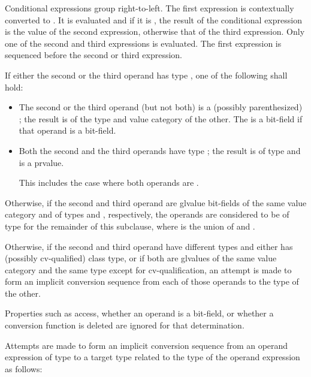 \pnum
Conditional expressions group right-to-left. The first expression is
contextually converted to .
It is
evaluated and if it is , the result of the conditional
expression is the value of the second expression, otherwise that of the
third expression. Only one of the second and third expressions is
evaluated.
The first expression is sequenced before
the second or third expression.

\pnum
If either the second or the third operand has type ,
one of the following shall hold:
\begin{itemize}
\item
{}%
The second or the third operand (but not both) is a (possibly
parenthesized) ; the result
is of the type and value category of the other.
The 
is a bit-field if that operand is a bit-field.

\item Both the second and the third operands have type ; the
result is of type  and is a prvalue.
\begin{note}
This
includes the case where both operands are .
\end{note}
\end{itemize}

\pnum
Otherwise, if the second and third operand are glvalue bit-fields
of the same value category and
of types   and  , respectively,
the operands are considered to be of type \cv{} 
for the remainder of this subclause,
where \cv{} is the union of  and .

\pnum
Otherwise, if the second and third operand have different types and
either has (possibly cv-qualified) class type, or if both
are glvalues of the same value category and the same type except for
cv-qualification, an attempt is made to
form an implicit conversion sequence from
each of those operands to the type of the other.
\begin{note}
Properties such as access, whether an operand is a bit-field, or whether
a conversion function is deleted are ignored for that determination.
\end{note}
Attempts are made to form an implicit conversion sequence
from an operand expression  of type 
to a target type related to the type 
of the operand expression  as follows:


